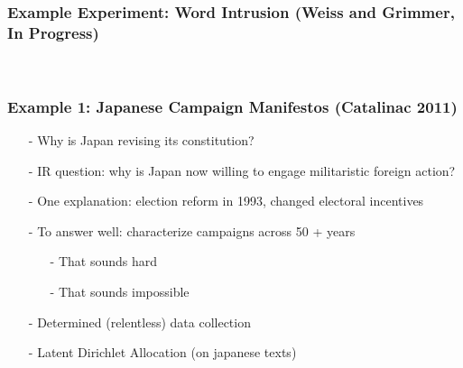 \documentclass{beamer}
\numberwithin{equation}{section}
\begin{document}
\begin{frame}
\frametitle{Example Experiment: Word Intrusion (Weiss and Grimmer, In Progress)}




  \\

\vspace{0.25in}


\pause \pause \pause \pause \pause


\end{frame}





\begin{frame}
\frametitle{Example 1: Japanese Campaign Manifestos (Catalinac 2011)}


\begin{itemize}
\item[-] Why is Japan revising its constitution?
\item[-] \alert{IR} question: why is Japan now willing to engage militaristic foreign action?
\item[-] \alert{One explanation}: election reform in 1993, changed electoral incentives
\item[-] To answer well: characterize campaigns across 50 + years
\begin{itemize}
\item[-] \alert{That sounds hard}
\item[-] \alert{That sounds impossible}
\end{itemize}
\item[-] Determined (relentless) data collection
\item[-] Latent Dirichlet Allocation (on japanese texts)
\end{itemize}


\end{frame}
\end{document}
